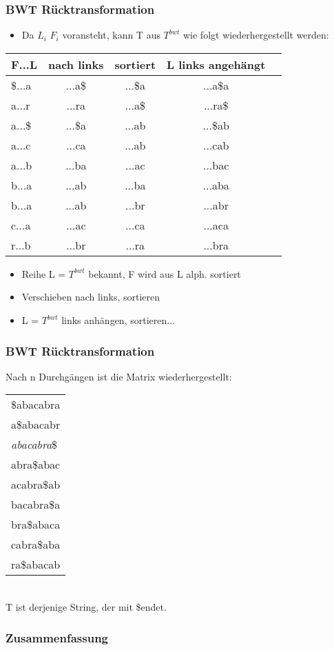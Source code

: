 \documentclass{beamer}
\begin{document}
\begin{frame}
\frametitle{BWT Rücktransformation}
\begin{itemize}
\item Da $L_i$ $F_i$ voransteht, kann T aus $T^{bwt}$ wie folgt wiederhergestellt werden:
\end{itemize}
\begin{tabular}{l<{\ttfamily} c<{\ttfamily} c<{\ttfamily}c<{\ttfamily} r<{\ttfamily}}
F...L & nach links &sortiert& L links angehängt\\\hline
\$...a &...a\$ &...\$a&...a\$a\\
a...r &...ra &...a\$&...ra\$\\
a...\$ &...\$a &...ab&...\$ab\\
a...c &...ca &...ab&...cab\\
a...b &...ba &...ac&...bac\\
b...a &...ab &...ba&...aba\\
b...a &...ab &...br&...abr\\
c...a &...ac &...ca&...aca\\
r...b &...br &...ra&...bra\\
\end{tabular}
\begin{itemize}
\item Reihe L = $T^{bwt}$ bekannt, F wird aus L alph. sortiert
\item Verschieben \glqq nach links\grqq, sortieren
\item L = $T^{bwt}$ links \glqq anhängen, sortieren...
\end{itemize}
\end{frame}
\begin{frame}
\frametitle{BWT Rücktransformation}
Nach n Durchgängen ist die Matrix wiederhergestellt:\\[5mm]
\begin{tabular}{l<{\ttfamily}}
\$abacabra \\
a\$abacabr \\
\color{red}\textit{abacabra}\$ \\
abra\$abac \\
acabra\$ab \\
bacabra\$a \\
bra\$abaca \\
cabra\$aba \\
ra\$abacab \\
\end{tabular}\\[5mm]
T ist derjenige String, der mit \glqq\$\grqq endet.
\end{frame}
\begin{frame}
 \frametitle{Zusammenfassung}
\end{frame}
\end{document}
